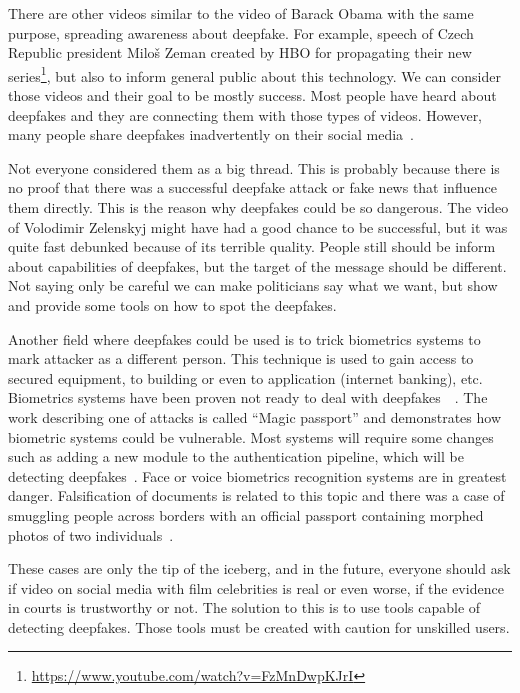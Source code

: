 There are other videos similar to the video of Barack Obama with the same purpose, spreading awareness about deepfake. For example, speech of Czech Republic president Miloš Zeman created by HBO for propagating their new series\footnote{\url{https://www.youtube.com/watch?v=FzMnDwpKJrI}}, but also to inform general public about this technology. We can consider those videos and their goal to be mostly success. Most people have heard about deepfakes and they are connecting them with those types of videos. However, many people share deepfakes inadvertently on their social media~\cite{DeepfakeSharing}.

Not everyone considered them as a big thread. This is probably because there is no proof that there was a successful deepfake attack or fake news that influence them directly. This is the reason why deepfakes could be so dangerous. The video of Volodimir Zelenskyj might have had a good chance to be successful, but it was quite fast debunked because of its terrible quality. People still should be inform about capabilities of deepfakes, but the target of the message should be different. Not saying only be careful we can make politicians say what we want, but show and provide some tools on how to spot the deepfakes.

Another field where deepfakes could be used is to trick biometrics systems to mark attacker as a different person. This technique is used to gain access to secured equipment, to building or even to application (internet banking), etc. Biometrics systems have been proven not ready to deal with deepfakes~\cite{DawnOfTextDependentSociety}~\cite{TheMagicPassport}. The work describing one of attacks is called “Magic passport” and demonstrates how biometric systems could be vulnerable. Most systems will require some changes such as adding a new module to the authentication pipeline, which will be detecting deepfakes~\cite{DigitalFaceManipulation}. Face or voice biometrics recognition systems are in greatest danger. Falsification of documents is related to this topic and there was a case of smuggling people across borders with an official passport containing morphed photos of two individuals~\cite{FaceMorphingAttackDetectionMethods}.

These cases are only the tip of the iceberg, and in the future, everyone should ask if video on social media with film celebrities is real or even worse, if the evidence in courts is trustworthy or not. The solution to this is to use tools capable of detecting deepfakes. Those tools must be created with caution for unskilled users.

